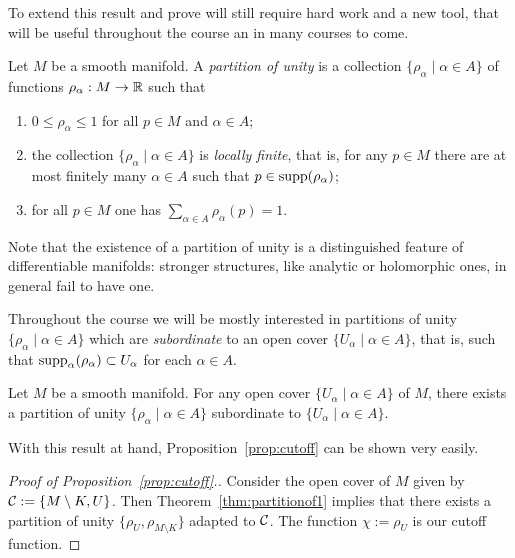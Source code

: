 To extend this result and prove will still require hard work and a new tool, that will be useful throughout the course an in many courses to come.

\begin{definition}
  Let $M$ be a smooth manifold. A \emph{partition of unity} is a collection $\{\rho_\alpha \mid \alpha\in A\}$ of functions $\rho_\alpha:M\to\mathbb{R}$ such that
  \begin{enumerate}
    \item $0 \leq \rho_\alpha \leq 1$ for all $p\in M$ and $\alpha\in A$;
    \item\label{def:pou.2} the collection $\{\rho_\alpha \mid \alpha\in A\}$ is \emph{locally finite}, that is, for any $p\in M$ there are at most finitely many $\alpha\in A$ such that $p\in\operatorname{supp}(\rho_\alpha)$;
    \item for all $p\in M$ one has $\sum_{\alpha\in A} \rho_\alpha(p) = 1$.
  \end{enumerate}
\end{definition}

\begin{remark}
Note that the existence of a partition of unity is a distinguished feature of differentiable manifolds: stronger structures, like analytic or holomorphic ones, in general fail to have one.
\end{remark}

Throughout the course we will be mostly interested in partitions of unity $\{\rho_\alpha \mid \alpha\in A\}$ which are \emph{subordinate} to an open cover $\{U_\alpha\mid\alpha\in A\}$, that is, such that $\operatorname{supp}_\alpha(\rho_\alpha) \subset U_\alpha$ for each $\alpha\in A$.

\begin{theorem}\label{thm:partitionof1}
  Let $M$ be a smooth manifold. For any open cover $\{U_\alpha\mid\alpha\in A\}$ of $M$, there exists a partition of unity $\{\rho_\alpha \mid \alpha\in A\}$ subordinate to $\{U_\alpha\mid\alpha\in A\}$.
\end{theorem}

With this result at hand, Proposition~\ref{prop:cutoff} can be shown very easily.

\begin{proof}[Proof of Proposition~\ref{prop:cutoff}.]
  Consider the open cover of $M$ given by $\mathcal{C}:=\{M\setminus K, U\}$.
  Then Theorem~\ref{thm:partitionof1} implies that there exists a partition of unity $\{\rho_U, \rho_{M\setminus K}\}$ adapted to $\mathcal{C}$. The function $\chi := \rho_U$ is our cutoff function.
\end{proof}

